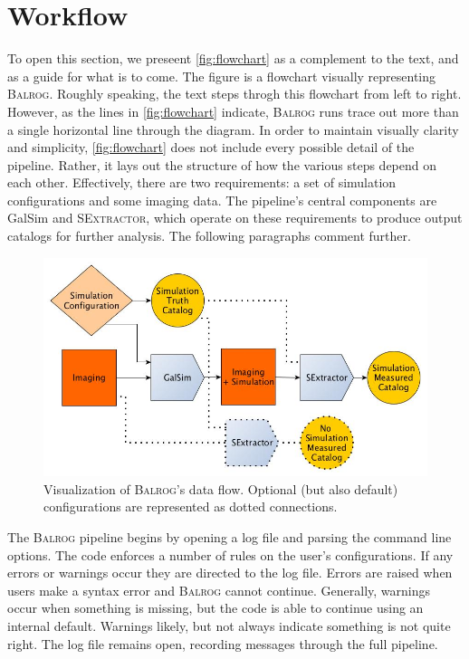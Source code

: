 \documentclass[12pt]{book}
\newcommand{\galsim}{GalSim}
\newcommand{\balrog}{\textsc{Balrog}}
\newcommand{\sex}{\textsc{SExtractor}}
\begin{document}
\section{Workflow}
\label{sec:workflow}

To open this section, we preseent \autoref{fig:flowchart} as a complement to the text,
and as a guide for what is to come.
The figure is a flowchart visually representing \balrog{}.
Roughly speaking, the text steps throgh this flowchart from left to right.
However, as the lines in \autoref{fig:flowchart} indicate, \balrog{} runs trace out more than a single horizontal line through the diagram.
In order to maintain visually clarity and simplicity, \autoref{fig:flowchart} does not include every possible detail of the pipeline.
Rather, it lays out the structure of how the various steps depend on each other.
Effectively, there are two requirements: a set of simulation configurations and some imaging data.
The pipeline's central components are \galsim{} and \sex{}, which operate on these requirements
to produce output catalogs for further analysis.
The following paragraphs comment further.


\begin{figure}[h]
\includegraphics[width=0.9\linewidth]{flowchart.jpg}
\caption{Visualization of \balrog{}'s data flow. Optional (but also default) configurations are represented as dotted connections.}
\label{fig:flowchart}
\end{figure}

The \balrog{}  pipeline begins by opening a log file and parsing the command line options.
The code enforces a number of rules on the user's configurations.
If any errors or warnings occur they are directed to the log file. 
Errors are raised when users make a syntax error and \balrog{} cannot continue.
Generally, warnings occur when something is missing, but the code is able to continue using an internal default. 
Warnings likely, but not always indicate something is not quite right.
The log file remains open, recording messages through the full pipeline.
\end{document}
